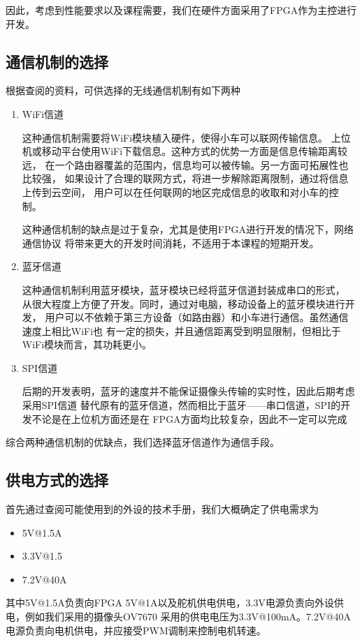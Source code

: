 \documentclass[UTF8,a4paper]{paper}
\begin{document}
因此，考虑到性能要求以及课程需要，我们在硬件方面采用了FPGA作为主控进行开发。
\subsection{通信机制的选择}
根据查阅的资料，可供选择的无线通信机制有如下两种

\begin{enumerate}
    \item WiFi信道

    这种通信机制需要将WiFi模块植入硬件，使得小车可以联网传输信息。
    上位机或移动平台使用WiFi下载信息。这种方式的优势一方面是信息传输距离较远，
    在一个路由器覆盖的范围内，信息均可以被传输。另一方面可拓展性也比较强，
    如果设计了合理的联网方式，将进一步解除距离限制，通过将信息上传到云空间，
    用户可以在任何联网的地区完成信息的收取和对小车的控制。

    这种通信机制的缺点是过于复杂，尤其是使用FPGA进行开发的情况下，网络通信协议
    将带来更大的开发时间消耗，不适用于本课程的短期开发。

    \item 蓝牙信道

    这种通信机制利用蓝牙模块，蓝牙模块已经将蓝牙信道封装成串口的形式，
    从很大程度上方便了开发。同时，通过对电脑，移动设备上的蓝牙模块进行开发，
    用户可以不依赖于第三方设备（如路由器）和小车进行通信。虽然通信速度上相比WiFi也
    有一定的损失，并且通信距离受到明显限制，但相比于WiFi模块而言，其功耗更小。

    \item SPI信道

    后期的开发表明，蓝牙的速度并不能保证摄像头传输的实时性，因此后期考虑采用SPI信道
    替代原有的蓝牙信道，然而相比于蓝牙——串口信道，SPI的开发不论是在上位机方面还是在
    FPGA方面均比较复杂，因此不一定可以完成

\end{enumerate}
综合两种通信机制的优缺点，我们选择蓝牙信道作为通信手段。
\subsection{供电方式的选择}
首先通过查阅可能使用到的外设的技术手册，我们大概确定了供电需求为
\begin{itemize}
    \item 5V@1.5A
    \item 3.3V@1.5
    \item 7.2V@40A
\end{itemize}
其中5V@1.5A负责向FPGA 5V@1A以及舵机供电供电，3.3V电源负责向外设供电，例如我们采用的摄像头OV7670
采用的供电电压为3.3V@100mA。7.2V@40A电源负责向电机供电，并应接受PWM调制来控制电机转速。
\end{document}
